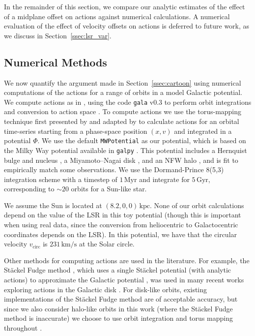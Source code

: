 \documentclass[twocolumn]{aastex62}
\newcommand{\kpc}{\text{kpc}}
\newcommand{\Myr}{\text{Myr}}
\newcommand{\Gyr}{\text{Gyr}}
\newcommand{\kms}{\text{km}/\text{s}}
\begin{document}
In the remainder of this section, we compare our analytic estimates of the
effect of a midplane offset on actions against numerical calculations. A
numerical evaluation of the effect of velocity offsets on actions is deferred
to future work, as we discuss in Section~\ref{ssec:lsr_var}.

\subsection{Numerical Methods} \label{ssec:action_comp}
We now quantify the argument made in Section~\ref{ssec:cartoon} using
numerical computations of the actions for a range of orbits in a model
Galactic potential. We compute actions as in \citet{2018ApJ...867...31B},
using the code \texttt{gala} v0.3 to perform orbit integrations and conversion
to action space \citep{2017JOSS....2..388P,Price-Whelan:2018}. To compute
actions we use the torus-mapping technique first presented by
\citet{1990MNRAS.244..634M} and adapted by \citet{2014MNRAS.441.3284S} to
calculate actions for an orbital time-series starting from a phase-space
position $(x, v)$ and integrated in a potential $\Phi$. We use the default
\texttt{MWPotential} as our potential, which is based on the Milky Way
potential available in \texttt{galpy} \citep{2015ApJS..216...29B}. This
potential includes a Hernquist bulge and nucleus \citep{1990ApJ...356..359H},
a Miyamoto--Nagai disk \citep{1975PASJ...27..533M}, and an NFW halo
\citep{1997ApJ...490..493N}, and is fit to empirically match some
observations. We use the Dormand-Prince 8(5,3) integration scheme
\citep{Dormand80:integrator} with a timestep of $1\,\Myr$ and integrate for
$5\,\Gyr$, corresponding to $\sim 20$ orbits for a Sun-like star.

We assume the Sun is located at $(8.2, 0, 0)\,\kpc$. None of our orbit
calculations depend on the value of the LSR in this toy potential (though this
is important when using real data, since the conversion from heliocentric to
Galactocentric coordinates depends on the LSR). In this potential, we have
that the circular velocity $v_{\text{circ}}$ is $231\,\kms$ at the Solar
circle.

Other methods for computing actions are used in the literature. For example,
the St\"ackel Fudge method \citep{2016MNRAS.457.2107S}, which uses a single
St\"ackel potential (with analytic actions) to approximate the Galactic
potential \citep{1985MNRAS.216..273D, 2012MNRAS.426.1324B}, was used in many
recent works exploring actions in the Galactic disk
\citep[e.g.][]{2019MNRAS.484.3291T, 2018MNRAS.481.4093S, 2018arXiv180803278T}.
For disk-like orbits, existing implementations of the St\"ackel Fudge method
are of acceptable accuracy, but since we also consider halo-like orbits in
this work (where the St\"ackel Fudge method is inaccurate) we choose to use
orbit integration and torus mapping throughout \citep{2016MNRAS.457.2107S}.
\end{document}
